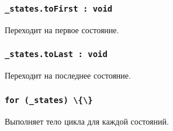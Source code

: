 \subsubsection{\lstinline|_states.toFirst : void|}

Переходит на первое состояние.

\subsubsection{\lstinline|_states.toLast : void|}

Переходит на последнее состояние.

\subsubsection{\lstinline|for (_states) \{\}|}

Выполняет тело цикла для каждой состояний.

